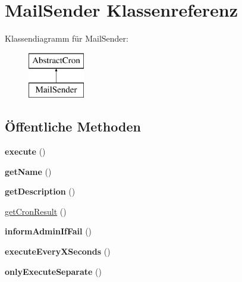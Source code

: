 \hypertarget{class_mail_sender}{}\section{Mail\+Sender Klassenreferenz}
\label{class_mail_sender}
Klassendiagramm für Mail\+Sender\+:\begin{figure}[H]
\begin{center}
\leavevmode
\includegraphics[height=2.000000cm]{class_mail_sender}
\end{center}
\end{figure}
\subsection*{Öffentliche Methoden}
\begin{DoxyCompactItemize}
\item 
\mbox{\label{class_mail_sender_a33ca83af10927da4fd124384b2a1333d}} 
{\bfseries execute} ()
\item 
\mbox{\label{class_mail_sender_ab0d0b577742795083fc9ee1c48e65e37}} 
{\bfseries get\+Name} ()
\item 
\mbox{\label{class_mail_sender_a7bf48e745c9e5bb883192d970e293425}} 
{\bfseries get\+Description} ()
\item 
\mbox{\hyperlink{class_mail_sender_ae995eb754b07488071eaa375b383c1b9}{get\+Cron\+Result}} ()
\item 
\mbox{\label{class_mail_sender_aa409d0afe02c4e83f379ba7e745e1656}} 
{\bfseries inform\+Admin\+If\+Fail} ()
\item 
\mbox{\label{class_mail_sender_a71b18fb7d15934e68d1911747d6ff7fc}} 
{\bfseries execute\+Every\+X\+Seconds} ()
\item 
\mbox{\label{class_mail_sender_acc6096b8929cfa38f01c9f08793512af}} 
{\bfseries only\+Execute\+Separate} ()
\end{DoxyCompactItemize}


